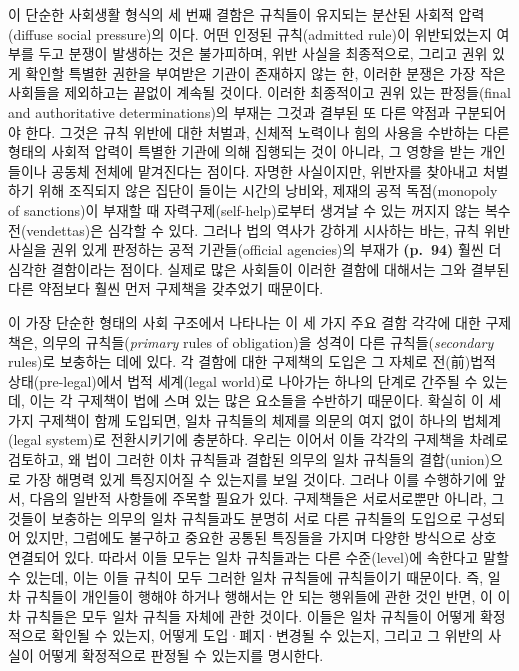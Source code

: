 이 단순한 사회생활 형식의 세 번째 결함은 규칙들이 유지되는 분산된 사회적
압력(diffuse social pressure)의 이다. 어떤
인정된 규칙(admitted rule)이 위반되었는지 여부를 두고 분쟁이 발생하는
것은 불가피하며, 위반 사실을 최종적으로, 그리고 권위 있게 확인할 특별한
권한을 부여받은 기관이 존재하지 않는 한, 이러한 분쟁은 가장 작은
사회들을 제외하고는 끝없이 계속될 것이다. 이러한 최종적이고 권위 있는
판정들(final and authoritative determinations)의 부재는 그것과 결부된 또
다른 약점과 구분되어야 한다. 그것은 규칙 위반에 대한 처벌과, 신체적
노력이나 힘의 사용을 수반하는 다른 형태의 사회적 압력이 특별한 기관에
의해 집행되는 것이 아니라, 그 영향을 받는 개인들이나 공동체 전체에
맡겨진다는 점이다. 자명한 사실이지만, 위반자를 찾아내고 처벌하기 위해
조직되지 않은 집단이 들이는 시간의 낭비와, 제재의 공적 독점(monopoly of
sanctions)이 부재할 때 자력구제(self-help)로부터 생겨날 수 있는 꺼지지
않는 복수전(vendettas)은 심각할 수 있다. 그러나 법의 역사가 강하게
시사하는 바는, 규칙 위반 사실을 권위 있게 판정하는 공적 기관들(official
agencies)의 부재가 \textbf{(p.~94)} 훨씬 더 심각한 결함이라는 점이다.
실제로 많은 사회들이 이러한 결함에 대해서는 그와 결부된 다른 약점보다
훨씬 먼저 구제책을 갖추었기 때문이다.

이 가장 단순한 형태의 사회 구조에서 나타나는 이 세 가지 주요 결함 각각에
대한 구제책은, 의무의  규칙들(\emph{primary} rules of
obligation)을 성격이 다른  규칙들(\emph{secondary} rules)로
보충하는 데에 있다. 각 결함에 대한 구제책의 도입은 그 자체로 전(前)법적
상태(pre-legal)에서 법적 세계(legal world)로 나아가는 하나의 단계로
간주될 수 있는데, 이는 각 구제책이 법에 스며 있는 많은 요소들을 수반하기
때문이다. 확실히 이 세 가지 구제책이 함께 도입되면, 일차 규칙들의 체제를
의문의 여지 없이 하나의 법체계(legal system)로 전환시키기에 충분하다.
우리는 이어서 이들 각각의 구제책을 차례로 검토하고, 왜 법이 그러한 이차
규칙들과 결합된 의무의 일차 규칙들의 결합(union)으로 가장 해명력 있게
특징지어질 수 있는지를 보일 것이다. 그러나 이를 수행하기에 앞서, 다음의
일반적 사항들에 주목할 필요가 있다. 구제책들은 서로서로뿐만 아니라,
그것들이 보충하는 의무의 일차 규칙들과도 분명히 서로 다른 규칙들의
도입으로 구성되어 있지만, 그럼에도 불구하고 중요한 공통된 특징들을
가지며 다양한 방식으로 상호 연결되어 있다. 따라서 이들 모두는 일차
규칙들과는 다른 수준(level)에 속한다고 말할 수 있는데, 이는 이들 규칙이
모두 그러한 일차 규칙들에  규칙들이기 때문이다. 즉,
일차 규칙들이 개인들이 행해야 하거나 행해서는 안 되는 행위들에 관한 것인
반면, 이 이차 규칙들은 모두 일차 규칙들 자체에 관한 것이다. 이들은 일차
규칙들이 어떻게 확정적으로 확인될 수 있는지, 어떻게 도입·폐지·변경될 수
있는지, 그리고 그 위반의 사실이 어떻게 확정적으로 판정될 수 있는지를
명시한다.

